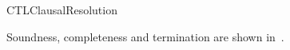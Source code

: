 \begin{entry}{CTLClausalResolution}
\begin{technicalities}
Soundness, completeness and termination are shown in~\cite{Zhang+Hustadt+Dixon@ToCL2014}.
\end{technicalities}



%
%
%
%
%
%
% 
%












\end{entry}
